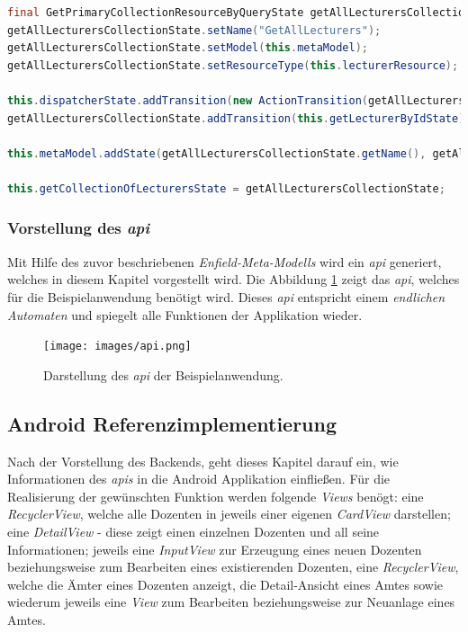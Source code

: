 \begin{lstlisting}[label=lst:getState_impl,
language=java,
firstnumber=1,
caption=Erzeugung des \textit{GetAllLecturers States}. ]
final GetPrimaryCollectionResourceByQueryState getAllLecturersCollectionState = new GetPrimaryCollectionResourceByQueryState();
getAllLecturersCollectionState.setName("GetAllLecturers");
getAllLecturersCollectionState.setModel(this.metaModel);
getAllLecturersCollectionState.setResourceType(this.lecturerResource);

this.dispatcherState.addTransition(new ActionTransition(getAllLecturersCollectionState, "getAllLecturers"));
getAllLecturersCollectionState.addTransition(this.getLecturerByIdState);

this.metaModel.addState(getAllLecturersCollectionState.getName(), getAllLecturersCollectionState);

this.getCollectionOfLecturersState = getAllLecturersCollectionState;
\end{lstlisting}
 
\subsubsection{Vorstellung des \textit{\acf{api}}}
Mit Hilfe des zuvor beschriebenen \textit{Enfield-Meta-Modells} wird ein \textit{\acl{api}} generiert, welches in diesem Kapitel vorgestellt wird.
Die Abbildung \ref{fig:api} zeigt das \textit{\acl{api}}, welches für die Beispielanwendung benötigt wird. Dieses\textit{ \ac{api}} entspricht einem \textit{endlichen Automaten} und spiegelt alle Funktionen der Applikation wieder.  

\begin{figure}[H]
	\begin{center}
		\texttt{[image: images/api.png]}
		\caption{Darstellung des \textit{\ac{api}} der Beispielanwendung.}
		\label{fig:api}
	\end{center}
\end{figure}

\subsection{Android Referenzimplementierung}\label{sec:ref_impl}
Nach der Vorstellung des Backends, geht dieses Kapitel darauf ein, wie Informationen des \textit{\acl{api}s} in die Android Applikation einfließen.
Für die Realisierung der gewünschten Funktion werden folgende \textit{Views} benögt: eine \textit{RecyclerView}, welche alle Dozenten in jeweils einer eigenen \textit{CardView} darstellen; eine \textit{DetailView} - diese zeigt einen einzelnen Dozenten und all seine Informationen; jeweils eine \textit{InputView} zur Erzeugung eines neuen Dozenten beziehungsweise zum Bearbeiten eines existierenden Dozenten, eine \textit{RecyclerView}, welche die Ämter eines Dozenten anzeigt, die Detail-Ansicht eines Amtes sowie wiederum jeweils eine \textit{View} zum Bearbeiten beziehungsweise zur Neuanlage eines Amtes.

